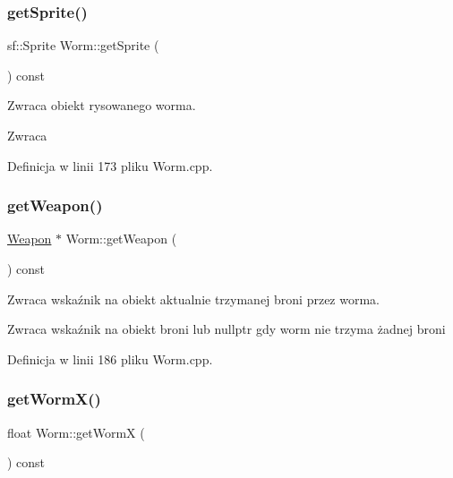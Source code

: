 \subsubsection{\texorpdfstring{get\+Sprite()}{getSprite()}}
{\footnotesize\ttfamily sf\+::\+Sprite Worm\+::get\+Sprite (\begin{DoxyParamCaption}{ }\end{DoxyParamCaption}) const}



Zwraca obiekt rysowanego worma. 

\begin{DoxyReturn}{Zwraca}

\end{DoxyReturn}


Definicja w linii 173 pliku Worm.\+cpp.

\mbox{\label{class_worm_a42f56e4d14502d65c500fb20bd31a561}} 
\subsubsection{\texorpdfstring{get\+Weapon()}{getWeapon()}}
{\footnotesize\ttfamily \mbox{\hyperlink{class_weapon}{Weapon}} $\ast$ Worm\+::get\+Weapon (\begin{DoxyParamCaption}{ }\end{DoxyParamCaption}) const}



Zwraca wskaźnik na obiekt aktualnie trzymanej broni przez worma. 

\begin{DoxyReturn}{Zwraca}
wskaźnik na obiekt broni lub nullptr gdy worm nie trzyma żadnej broni 
\end{DoxyReturn}


Definicja w linii 186 pliku Worm.\+cpp.

\mbox{\label{class_worm_a9787181c41ca3a4ac5098277e8a4a142}} 
\subsubsection{\texorpdfstring{get\+Worm\+X()}{getWormX()}}
{\footnotesize\ttfamily float Worm\+::get\+WormX (\begin{DoxyParamCaption}{ }\end{DoxyParamCaption}) const}



